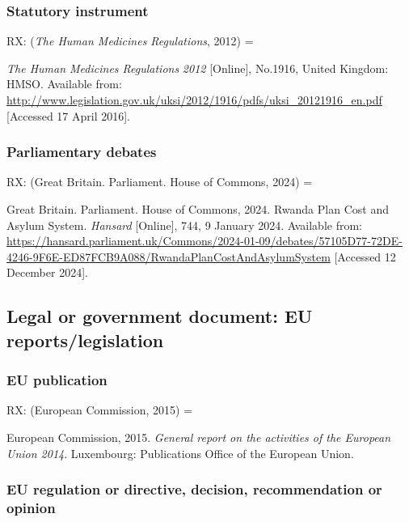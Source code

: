 \subsubsection*{Statutory instrument}

RX: (\emph{The Human Medicines Regulations}, 2012) = \cite{gb.hmr2012}

\emph{The Human Medicines Regulations} \emph{2012} [Online], No.1916, United Kingdom: HMSO. Available from: \url{http://www.legislation.gov.uk/uksi/2012/1916/pdfs/uksi_20121916_en.pdf} [Accessed 17 April 2016].




\subsubsection*{Parliamentary debates}

RX: (Great Britain. Parliament. House of Commons, 2024) = \cite{gb.hc2024rpc}

Great Britain. Parliament. House of Commons, 2024. Rwanda Plan Cost and Asylum System. \emph{Hansard} [Online], 744, 9 January 2024. Available from: \url{https://hansard.parliament.uk/Commons/2024-01-09/debates/57105D77-72DE-4246-9F6E-ED87FCB9A088/RwandaPlanCostAndAsylumSystem} [Accessed 12 December 2024].



\subsection{Legal or government document: EU reports\slash legislation}


\subsubsection*{EU publication}

RX: (European Commission, 2015) = \cite{ec2015gra}

European Commission, 2015. \emph{General report on the activities of the European Union 2014}. Luxembourg: Publications Office of the European Union.




\subsubsection*{EU regulation or directive, decision, recommendation or opinion}

